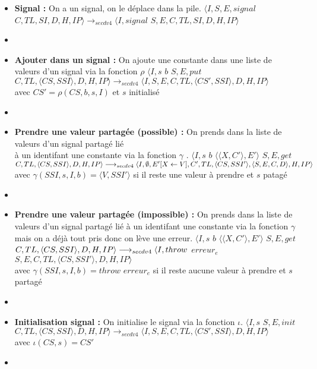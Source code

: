 \documentclass[10pt,a4paper]{article}
\begin{document}
\begin{enumerate}
\begin{itemize}
			    	\item[]  \textbf{Signal :} On a un signal, on le déplace dans la pile.
			    	\smallbreak 
			    	$\langle I,S,E,signal$ $C,TL,SI,D,H,IP\rangle
			    	\longrightarrow_{secdv4} \langle I,signal$ $S,E,C,TL,SI,D,H,IP\rangle$
			    	\item[]
			    	
			    	\item[] \textbf{Ajouter dans un signal :} On ajoute une constante dans une liste de valeurs d'un signal via la fonction $\rho$
			    	\smallbreak
			    	$\langle I,s$ $b$ $S,E,put$ $C,TL,\langle CS,SSI\rangle,D,H,IP\rangle \longrightarrow_{secdv4} \langle I,S,E,C,TL,\langle CS',SSI\rangle,D,H,IP\rangle$ \\
			    	avec $CS' = \rho(CS,b,s,I)$ et $s$ initialisé
			    	\item[]
			    	
			    	\item[] \textbf{Prendre une valeur partagée (possible) :} On prends dans la liste de valeurs d'un signal partagé lié \\
			    	à un identifant une constante via la fonction $\gamma$ .
			    	\smallbreak
			    	$\langle I,s$ $b$ $\langle\langle X,C'\rangle,E'\rangle$ $S,E,get$ $C,TL,\langle CS,SSI\rangle,D,H,IP\rangle 
			    	\\\longrightarrow_{secdv4} \langle I,\emptyset,E'[X \leftarrow V],C',TL,\langle CS,SSI'\rangle,\langle S,E,C,D\rangle,H,IP\rangle$\\
			    	avec $ \gamma(SSI,s,I,b) = \langle V,SSI'\rangle$ si il reste une valeur à prendre et $s$ patagé
			    	\item[]
			    	
			    	\item[] \textbf{Prendre une valeur partagée (impossible) :} On prends dans la liste de valeurs d'un signal partagé lié à un identifant une constante via la fonction $\gamma$ mais on a déjà tout pris donc on lève une erreur.
			    	\smallbreak 
			    	$\langle I,s$ $b$ $\langle\langle X,C'\rangle,E'\rangle$ $S,E,get$ $C,TL,\langle CS,SSI\rangle,D,H,IP\rangle 
			    	\\\longrightarrow_{secdv4} \langle I,throw$ $erreur_{e}$ $S,E,C,TL,\langle CS,SSI'\rangle,D,H,IP\rangle$\\
			    	avec $ \gamma(SSI,s,I,b) = throw$ $erreur_{e}$ si il reste aucune valeur à prendre et $s$ partagé
			    	\item[]
			    	
			    	\item[] \textbf{Initialisation signal :} On initialise le signal via la fonction $\iota$.
			    	\smallbreak 
			    	$\langle I,s$ $S,E,init$ $C,TL,\langle CS,SSI\rangle,D,H,IP\rangle 
			    	\longrightarrow_{secdv4} \langle I,S,E,C,TL,\langle CS',SSI\rangle,D,H,IP\rangle$\\
			    	avec $\iota(CS,s) = CS'$
			    	\item[]	
			    	

\end{itemize}
\end{enumerate}
\end{document}
